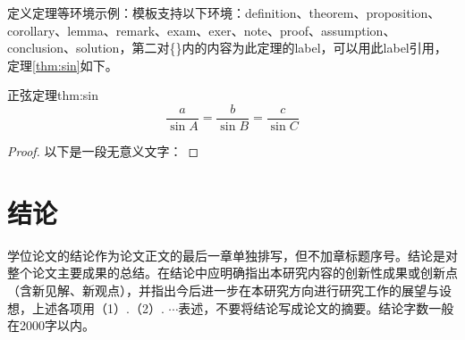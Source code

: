 \documentclass{dmuthesis}
\begin{document}
定义定理等环境示例：模板支持以下环境：definition、theorem、proposition、corollary、lemma、remark、exam、exer、note、proof、assumption、conclusion、solution，第二对\{\}内的内容为此定理的label，可以用此label引用，定理\ref{thm:sin}如下。
\begin{theorem}{正弦定理}{thm:sin}
\begin{equation}
\frac{a}{\sin A}=\frac{b}{\sin B}=\frac{c}{\sin C}
\end{equation}
\vspace{0.01cm}
\end{theorem}
\begin{proof}
以下是一段无意义文字：\lipsum[5]
\end{proof}

\chapter*{结\quad 论}

学位论文的结论作为论文正文的最后一章单独排写，但不加章标题序号。结论是对整个论文主要成果的总结。在结论中应明确指出本研究内容的创新性成果或创新点（含新见解、新观点），并指出今后进一步在本研究方向进行研究工作的展望与设想，上述各项用（1）.（2）.  $\cdots$表述，不要将结论写成论文的摘要。结论字数一般在2000字以内。
\end{document}
